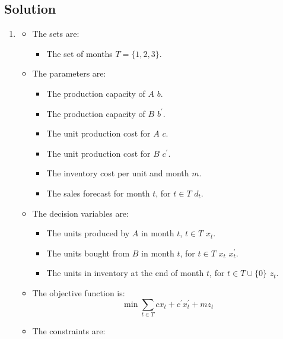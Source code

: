 \documentclass[12pt, a4paper]{report}
\newtheorem[style=M,bodystyle=\normalfont]{theorem}{Theorem}
\newtheorem[style=M,bodystyle=\normalfont]{corollary}{Corollary}
\newtheorem[style=M,bodystyle=\normalfont]{lemma}{Lemma}
\newtheorem[style=M,bodystyle=\normalfont]{definition}{Definition}
\begin{document}
    \subsection*{Solution}
        \begin{enumerate}
            \item \begin{itemize}
                    \item The sets are: 
                        \begin{itemize}
                            \item The set of months $T=\{1,2,3\}$. 
                        \end{itemize}
                    \item The parameters are: 
                        \begin{itemize}
                            \item The production capacity of $A$ $b$. 
                            \item The production capacity of $B$ $b^{'}$. 
                            \item The unit production cost for $A$ $c$. 
                            \item The unit production cost for $B$ $c^{'}$. 
                            \item The inventory cost per unit and month $m$. 
                            \item The sales forecast for month $t$, for $t \in T$ $d_t$. 
                        \end{itemize}
                    \item The decision variables are:
                        \begin{itemize}
                            \item The units produced by $A$ in month $t$, $t \in T$ $x_t$. 
                            \item The units bought from $B$ in month $t$, for $t \in T$ $x_t$ $x_t^{'}$.
                            \item The units in inventory at the end of month $t$, for $t \in T \cup \{0\}$ $z_t$. 
                        \end{itemize}
                    \item The objective function is: 
                        \[\min{\sum_{t \in T}{cx_t+c^{'}x_t^{'}+mz_t}}\]
                    \item The constraints are:

\end{itemize}
\end{enumerate}
\end{document}

